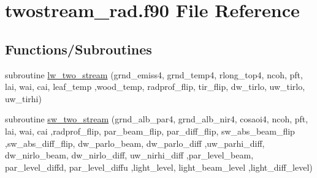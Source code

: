 \hypertarget{twostream__rad_8f90}{}\section{twostream\+\_\+rad.\+f90 File Reference}
\label{twostream__rad_8f90}
\subsection*{Functions/\+Subroutines}
\begin{DoxyCompactItemize}
\item 
subroutine \hyperlink{twostream__rad_8f90_a6581b5d4ea4bd5a6c7a8e742257dd0d1}{lw\+\_\+two\+\_\+stream} (grnd\+\_\+emiss4, grnd\+\_\+temp4, rlong\+\_\+top4, ncoh, pft, lai, wai, cai, leaf\+\_\+temp                                                                                               ,wood\+\_\+temp, radprof\+\_\+flip, tir\+\_\+flip, dw\+\_\+tirlo, uw\+\_\+tirlo, uw\+\_\+tirhi)
\item 
subroutine \hyperlink{twostream__rad_8f90_abe93885fe642dcef8db1fb3977179585}{sw\+\_\+two\+\_\+stream} (grnd\+\_\+alb\+\_\+par4, grnd\+\_\+alb\+\_\+nir4, cosaoi4, ncoh, pft, lai, wai, cai                                                                                                                               ,radprof\+\_\+flip, par\+\_\+beam\+\_\+flip, par\+\_\+diff\+\_\+flip, sw\+\_\+abs\+\_\+beam\+\_\+flip                                                                                                                           ,sw\+\_\+abs\+\_\+diff\+\_\+flip, dw\+\_\+parlo\+\_\+beam, dw\+\_\+parlo\+\_\+diff                                                                                                                                                                               ,uw\+\_\+parhi\+\_\+diff, dw\+\_\+nirlo\+\_\+beam, dw\+\_\+nirlo\+\_\+diff, uw\+\_\+nirhi\+\_\+diff                                                                                                                                   ,par\+\_\+level\+\_\+beam, par\+\_\+level\+\_\+diffd, par\+\_\+level\+\_\+diffu                                                                                                                                                                   ,light\+\_\+level, light\+\_\+beam\+\_\+level                                                                                                                       ,light\+\_\+diff\+\_\+level)
\end{DoxyCompactItemize}


